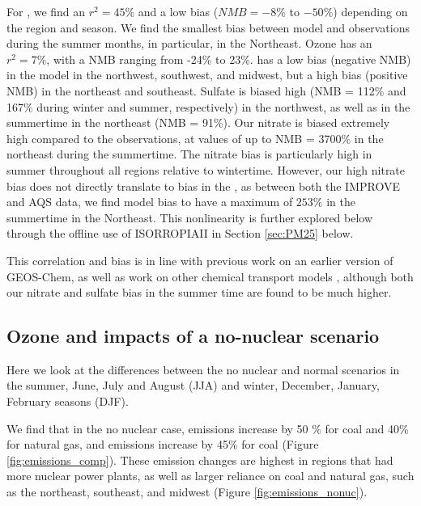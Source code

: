 \documentclass[12]{article}
\begin{document}
For , we find an $r^2 = 45\%$ and a low bias ($NMB = -8\%$ to $-50\%$) depending on the region and season. We find the smallest bias between model  and observations during the summer months, in particular, in the Northeast. Ozone has an $r^2 = 7\%$, with a NMB ranging from -24\% to 23\%.  has a low bias (negative NMB) in the model in the northwest, southwest, and midwest, but a high bias (positive NMB) in the northeast and southeast. Sulfate is biased high (NMB = 112\% and 167\% during winter and summer, respectively) in the northwest, as well as in the summertime in the northeast (NMB = 91\%). Our nitrate is biased extremely high compared to the observations, at values of up to NMB = 3700\% in the northeast during the summertime. The nitrate bias is particularly high in summer throughout all regions relative to wintertime. However, our high nitrate bias does not directly translate to bias in the , as between both the IMPROVE and AQS data, we find model bias to have a maximum of $253\%$ in the summertime in the Northeast. This nonlinearity is further explored below through the offline use of ISORROPIAII in Section \ref{sec:PM25} below. 

This correlation and bias is in line with previous work \citep{holt_changes_2015} on an earlier version of GEOS-Chem, as well as work on other chemical transport models \citep{simon_compilation_2012}, although both our nitrate and sulfate bias in the summer time are found to be much higher.

\subsection{Ozone and  impacts of a no-nuclear scenario}
Here we look at the differences between the no nuclear and normal scenarios in the summer, June, July and August (JJA) and winter, December, January, February seasons (DJF). 

We find that in the no nuclear case,  emissions increase by 50 \% for coal and 40\% for natural gas, and  emissions increase by 45\% for coal (Figure \ref{fig:emissions_comp}). These emission changes are highest in regions that had more nuclear power plants, as well as larger reliance on coal and natural gas, such as the northeast, southeast, and midwest (Figure \ref{fig:emissions_nonuc}). 
\end{document}
